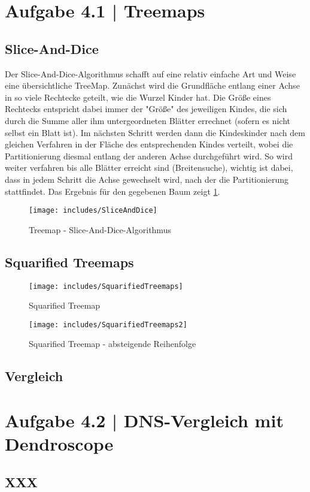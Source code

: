 \documentclass[a4paper,12pt,ngerman]{scrartcl}
\begin{document}
\pagestyle{fancy} %

\section{Aufgabe 4.1 | Treemaps}
\subsection*{Slice-And-Dice}

Der Slice-And-Dice-Algorithmus schafft auf eine relativ einfache Art und Weise eine übersichtliche TreeMap. Zunächst wird die Grundfläche entlang einer Achse in so viele Rechtecke geteilt, wie die Wurzel Kinder hat. Die Größe eines Rechtecks entspricht dabei immer der "Größe" des jeweiligen Kindes, die sich durch die Summe aller ihm untergeordneten Blätter errechnet (sofern es nicht selbst ein Blatt ist). Im nächsten Schritt werden dann die Kindeskinder nach dem gleichen Verfahren in der Fläche des entsprechenden Kindes verteilt, wobei die Partitionierung diesmal entlang der anderen Achse durchgeführt wird. So wird weiter verfahren bis alle Blätter erreicht sind (Breitensuche), wichtig ist dabei, dass in jedem Schritt die Achse gewechselt wird, nach der die Partitionierung stattfindet. Das Ergebnis für den gegebenen Baum zeigt \cref{fig:sliceAndDice}.

\begin{figure}[ht]
    \centering
    \texttt{[image: includes/SliceAndDice]}
    \caption{Treemap - Slice-And-Dice-Algorithmus}
    \label{fig:sliceAndDice}
\end{figure}

\subsection*{Squarified Treemaps}

\begin{figure}[ht]
    \centering
    \texttt{[image: includes/SquarifiedTreemaps]}
    \caption{Squarified Treemap}
    \label{fig:squarifiedTreemap}
\end{figure}

\begin{figure}[ht]
    \centering
    \texttt{[image: includes/SquarifiedTreemaps2]}
    \caption{Squarified Treemap - absteigende Reihenfolge}
    \label{fig:squarifiedTreemap2}
\end{figure}

\subsection*{Vergleich}

\section{Aufgabe 4.2 | DNS-Vergleich mit Dendroscope}
\subsection*{XXX}
\end{document}
